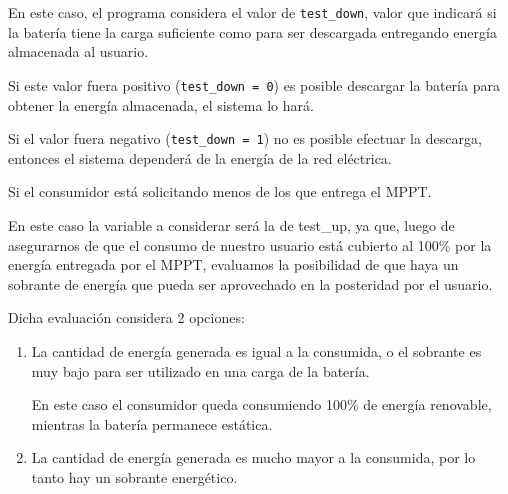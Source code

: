 \begin{itemize} [label = ·]
                    En este caso, el programa considera el valor de \texttt{test\_down}, valor que indicará si la batería tiene la carga suficiente como para ser descargada entregando energía almacenada al usuario.\par
                    Si este valor fuera positivo (\texttt{test\_down = 0}) es posible descargar la batería para obtener la energía almacenada, el sistema lo hará.\par
                    Si el valor fuera negativo (\texttt{test\_down = 1}) no es posible efectuar la descarga, entonces el sistema dependerá de la energía de la red eléctrica.\par
                    Si el consumidor está solicitando menos de los que entrega el MPPT.\par
                    
                    \par
                    
                    En este caso la variable a considerar será la de test\_up, ya que, luego de asegurarnos de que el consumo de nuestro usuario está cubierto al 100\% por la energía entregada por el MPPT, evaluamos la posibilidad de que haya un sobrante de energía que pueda ser aprovechado en la posteridad por el usuario.\par
                    Dicha evaluación considera 2 opciones:\par
                    
                    \begin{enumerate}
                    \setlength{\itemindent}{1.5em}
                    
                        \item La cantidad de energía generada es igual a la consumida, o el sobrante es muy bajo para ser utilizado en una carga de la batería.\par
                    
                        \par
                    
                        En este caso el consumidor queda consumiendo 100\% de energía renovable, mientras la batería permanece estática.\par
                        
                        \item La cantidad de energía generada es mucho mayor a la consumida, por lo tanto hay un sobrante energético.\par
                    

\end{enumerate}
\end{itemize}
